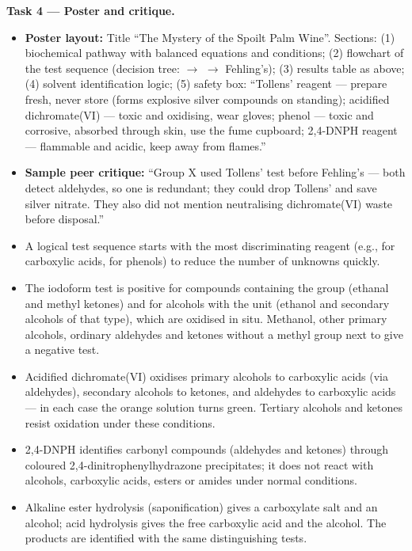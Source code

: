 \documentclass[11pt]{article}
\begin{document}
\textbf{Task 4 --- Poster and critique.}\par
\begin{itemize}
    \item \textbf{Poster layout:} Title ``The Mystery of the Spoilt Palm Wine''. Sections: (1) biochemical pathway with balanced equations and conditions; (2) flowchart of the test sequence (decision tree:  $\to$  $\to$ Fehling's); (3) results table as above; (4) solvent identification logic; (5) safety box: ``Tollens' reagent --- prepare fresh, never store (forms explosive silver compounds on standing); acidified dichromate(VI) --- toxic and oxidising, wear gloves; phenol --- toxic and corrosive, absorbed through skin, use the fume cupboard; 2,4-DNPH reagent --- flammable and acidic, keep away from flames.''
    \item \textbf{Sample peer critique:} ``Group X used Tollens' test before Fehling's --- both detect aldehydes, so one is redundant; they could drop Tollens' and save silver nitrate. They also did not mention neutralising dichromate(VI) waste before disposal.''
\end{itemize}

\begin{aretenir}
\begin{itemize}
\item A logical test sequence starts with the most discriminating reagent (e.g.,  for carboxylic acids,  for phenols) to reduce the number of unknowns quickly.
\item The iodoform test is positive for compounds containing the  group (ethanal and methyl ketones) and for alcohols with the  unit (ethanol and secondary alcohols of that type), which are oxidised in situ. Methanol, other primary alcohols, ordinary aldehydes and ketones without a methyl group next to  give a negative test.
\item Acidified dichromate(VI) oxidises primary alcohols to carboxylic acids (via aldehydes), secondary alcohols to ketones, and aldehydes to carboxylic acids --- in each case the orange solution turns green. Tertiary alcohols and ketones resist oxidation under these conditions.
\item 2,4-DNPH identifies carbonyl compounds (aldehydes and ketones) through coloured 2,4-dinitrophenylhydrazone precipitates; it does not react with alcohols, carboxylic acids, esters or amides under normal conditions.
\item Alkaline ester hydrolysis (saponification) gives a carboxylate salt and an alcohol; acid hydrolysis gives the free carboxylic acid and the alcohol. The products are identified with the same distinguishing tests.
\end{itemize}
\end{aretenir}
\end{document}
